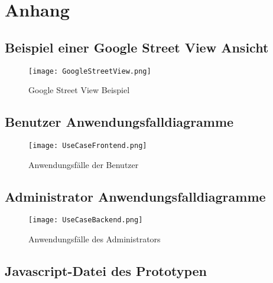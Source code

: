 \section{Anhang}
\label{sec:Anhang}


\subsection{Beispiel einer Google Street View Ansicht}
\label{sec:BeispielEinerGoogleStreetViewAnsicht}

\begin{figure}[htb]
\centering
\texttt{[image: GoogleStreetView.png]}
\caption[Google Street View Beispiel]{Google Street View Beispiel\protect\footnotemark}
\label{fig:GoogleStreetViewBeispiel}
\end{figure}

\clearpage
\subsection{Benutzer Anwendungsfalldiagramme}
\label{sec:BenutzerAnwendungsfalldiagramme}

\begin{figure}[htb]
\centering
\texttt{[image: UseCaseFrontend.png]}
\caption[Benutzer Anwendungsfälle]{Anwendungsfälle der Benutzer\protect\footnotemark}
\label{fig:UseCaseFrontend}
\end{figure}

\clearpage
\begin{landscape}
  \subsection{Administrator Anwendungsfalldiagramme}
  \label{sec:AdminAnwendungsfalldiagramme}

  \begin{figure}[htb]
  \centering
  \texttt{[image: UseCaseBackend.png]}
  \caption[Administrator Anwendungsfälle]{Anwendungsfälle des Administrators\protect\footnotemark}
  \label{fig:UseCaseFrontend}
  \end{figure}
\end{landscape}

\subsection{Javascript-Datei des Prototypen}
\label{sec:AnhangJavascriptPrototyp}


